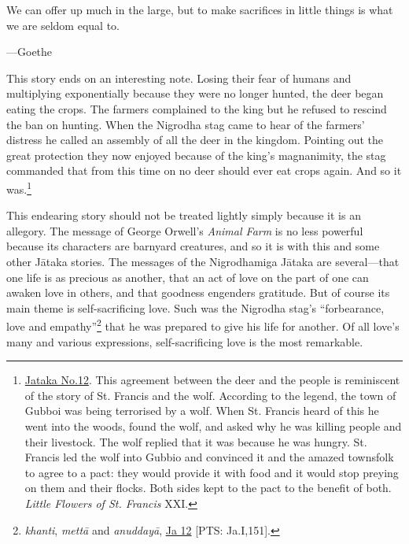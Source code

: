 \documentclass[10pt, openright]{book}
\newenvironment{epigram-2}%
{%
\vspace{1em}
\noindent
\quoting[leftmargin=2.5cm,rightmargin=2.5cm]%
\begin{itshape}
\large
}%
{\end{itshape}\endquoting
}%
\newenvironment{epigram-2-cite}%
{%
\quoting[leftmargin=2.5cm,rightmargin=2.5cm]%
\noindent\normal\hspace*{\fill} 
}%
{\endquoting\vspace{1em}
}%
\begin{document}
\begin{epigram-2}
We can offer up much in the large, but to make sacrifices in little things is what we are seldom equal to.
\end{epigram-2}

\begin{epigram-2-cite}
—Goethe
\end{epigram-2-cite}

This story ends on an interesting note. Losing their fear of humans and multiplying exponentially because they were no longer hunted, the deer began eating the crops. The farmers complained to the king but he refused to rescind the ban on hunting. When the Nigrodha stag came to hear of the farmers’ distress he called an assembly of all the deer in the kingdom. Pointing out the great protection they now enjoyed because of the king’s magnanimity, the stag commanded that from this time on no deer should ever eat crops again. And so it was.\footnote {\href{https://suttacentral.net/ja12/en/chalmers}{Jataka No.12}. This agreement between the deer and the people is reminiscent of the story of St. Francis and the wolf. According to the legend, the town of Gubboi was being terrorised by a wolf. When St. Francis heard of this he went into the woods, found the wolf, and asked why he was killing people and their livestock. The wolf replied that it was because he was hungry. St. Francis led the wolf into Gubbio and convinced it and the amazed townsfolk to agree to a pact: they would provide it with food and it would stop preying on them and their flocks. Both sides kept to the pact to the benefit of both. \textit{Little Flowers of St. Francis} XXI.}


This endearing story should not be treated lightly simply because it is an allegory. The message of George Orwell’s \textit{Animal Farm} is no less powerful because its characters are barnyard creatures, and so it is with this and some other Jātaka stories. The messages of the Nigrodhamiga Jātaka are several—that one life is as precious as another, that an act of love on the part of one can awaken love in others, and that goodness engenders gratitude. But of course its main theme is self-sacrificing love. Such was the Nigrodha stag’s “forbearance, love and empathy”\footnote {\textit{khanti}, \textit{mettā} and \textit{anuddayā}, \href{https://suttacentral.net/ja12/en/chalmers?reference=main/pts#pts-vp-pli151}{Ja 12} [PTS: Ja.I,151].} that he was prepared to give his life for another. Of all love’s many and various expressions, self-sacrificing love is the most remarkable.
\end{document}

